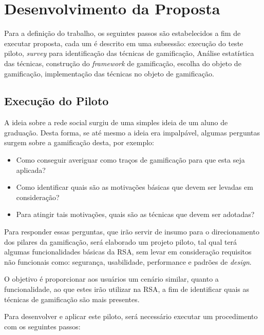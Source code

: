 \chapter[Desenvolvimento da Proposta]{Desenvolvimento da Proposta}

Para a definição do trabalho, os seguintes
passos são estabelecidos a fim de executar proposta, cada um é
descrito em uma subsessão: execução do teste piloto, \textit{survey} para identificação das técnicas de gamificação,
Análise estatística das técnicas, construção do \textit{framework} de gamificação, escolha do objeto de gamificação,
implementação das técnicas no objeto de gamificação.

\section{Execução do Piloto}
\label{sub:execu_o_do_piloto}
A ideia sobre a rede social surgiu de uma simples ideia de um aluno de graduação. Desta forma, se até mesmo a
ideia era impalpável, algumas perguntas surgem sobre a gamificação desta, por exemplo:

\begin{itemize}
    \item Como conseguir averiguar como traços de gamificação para que esta seja aplicada?
    \item Como identificar quais são as motivações básicas que devem ser levadas em consideração?
    \item Para atingir tais motivações, quais são as técnicas que devem ser adotadas?
\end{itemize}

Para responder essas perguntas, que irão servir de insumo para o direcionamento dos pilares da gamificação, será elaborado um projeto piloto, tal qual terá algumas funcionalidades básicas da RSA, sem levar em consideração requisitos não funcionais como: segurança, usabilidade, performance e padrões de \textit{design}.

O objetivo é proporcionar aos usuários um cenário similar, quanto a funcionalidade, ao que estes irão utilizar
na RSA, a fim de identificar quais as técnicas de gamificação são mais presentes.

Para desenvolver e aplicar este piloto, será necessário executar um procedimento com os seguintes passos:

